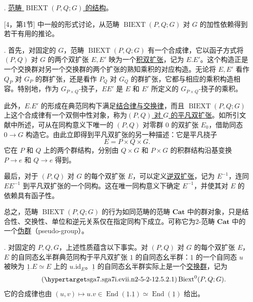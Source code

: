

. \underline{范畴 $\operatorname{BIEXT}(P,Q;G)$ 的结构}。

[4，第1节] 中一般的形式讨论，从范畴 $\operatorname{BIEXT}(P,Q;G)$ 对 $G$ 的加性依赖得到若干有用的推论。

. 首先，对固定的 $G$，范畴 $\operatorname{BIEXT}(P,Q;G)$ 有一个合成律，它以函子方式将 $(P,Q)$ 对 $G$ 的两个双扩张 $E,E'$ 映为一个\underline{积双扩张}，记为 $E.E'$。这个构造正是一个交换群对另一个交换群的两个扩张的熟知乘积的对应构造。无论将 $E,E'$ 看作 $Q_P$ 对 $G_P$ 的群扩张，还是看作 $P_Q$ 对 $G_Q$ 的群扩张，它都与相应的乘积构造相容。特别地，作为 $G_{P\times Q}$-挠子，$EE'$ 是 $E$ 和 $E'$ 所定义的 $G_{P\times Q}$-挠子的乘积。

此外，$E.E'$ 的形成在典范同构下满足\underline{结合律与交换律}，而且 $\operatorname{BIEXT}(P,Q;G)$ 上这个合成律有一个双侧中性对象，称为\underline{$(P,Q)$ 对 $G$ 的平凡双扩张}。如所引文献中所述，可从在同构意义下唯一的 $(P,Q)$ 对零群 $0$ 的双扩张 $E_0$，借助同态 $0\longrightarrow G$ 构造它。由此立即得到平凡双扩张的另一种描述：它是平凡挠子
\[
 E=P\times Q\times G.
\]
它在 $P$ 和 $Q$ 上的两个群结构，分别由 $Q\times G$ 和 $P\times G$ 的积群结构沿基变换 $P\longrightarrow e$ 和 $Q\longrightarrow e$ 得到。

最后，对于 $(P,Q)$ 对 $G$ 的每个双扩张 $E$，可以定义\underline{逆双扩张}，记为 $E^{-1}$，连同 $EE^{-1}$ 到平凡双扩张的一个同构。这在唯一同构意义下确定 $E^{-1}$，并使其对 $E$ 的依赖具有函子性。

总之，范畴 $\operatorname{BIEXT}(P,Q;G)$ 的行为如同范畴的范畴 $\mathbf{Cat}$ 中的群对象，只是结合性、交换性、单位和逆元关系仅在指定同构下成立。可称它为2-范畴 $\mathbf{Cat}$ 中的一个\underline{伪群}（pseudo-group）。

. 对固定的 $P,Q,G$，上述性质蕴含以下事实。对 $(P,Q)$ 对 $G$ 的每个双扩张 $E$，$E$ 的自同态幺半群典范同构于平凡双扩张 $\underline 1$ 的自同态幺半群：$\underline 1$ 的一个自同态 $u$ 被映为 $\underline 1.E\simeq E$ 上的 $u.\mathrm{id}_E$。$\underline 1$ 的自同态幺半群实际上是一个\underline{交换群}，记为
\begin{equation}\tag{\SGARefTarget{sga7.sga7i.evii.n2-5-2-1}{2.5.2.1}}
 \operatorname{Biext}^{0}(P,Q;G).
\end{equation}
它的合成律也由 $(u,v)\mapsto u.v\in\operatorname{End}(\underline 1.\underline 1)\simeq\operatorname{End}(\underline 1)$ 给出。

